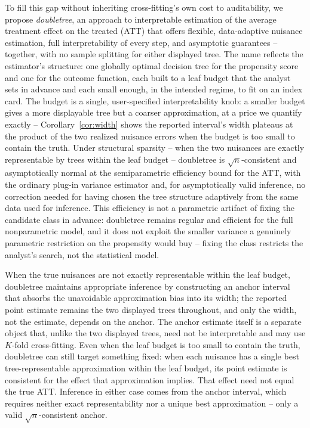\documentclass[12pt]{article}
\begin{document}
To fill this gap without inheriting cross-fitting's own cost to auditability, we propose \emph{doubletree}, an approach to interpretable estimation of the average treatment effect on the treated (ATT) that offers flexible, data-adaptive nuisance estimation, full interpretability of every step, and asymptotic guarantees -- together, with no sample splitting for either displayed tree. The name reflects the estimator's structure: one globally optimal decision tree \citep{xuStatisticalOptimalityOptimal2026,mctavishFastSparseDecision2022} for the propensity score and one for the outcome function, each built to a leaf budget that the analyst sets in advance and each small enough, in the intended regime, to fit on an index card. The budget is a single, user-specified interpretability knob: a smaller budget gives a more displayable tree but a coarser approximation, at a price we quantify exactly -- Corollary~\ref{cor:width} shows the reported interval's width plateaus at the product of the two realized nuisance errors when the budget is too small to contain the truth. Under structural sparsity -- when the two nuisances are exactly representable by trees within the leaf budget -- doubletree is $\sqrt n$-consistent and asymptotically normal at the semiparametric efficiency bound for the ATT, with the ordinary plug-in variance estimator and, for asymptotically valid inference, no correction needed for having chosen the tree structure adaptively from the same data used for inference. This efficiency is not a parametric artifact of fixing the candidate class in advance: doubletree remains regular and efficient for the full nonparametric model, and it does not exploit the smaller variance a genuinely parametric restriction on the propensity would buy -- fixing the class restricts the analyst's search, not the statistical model. 

When the true nuisances are not exactly representable within the leaf budget, doubletree maintains appropriate inference by constructing an anchor interval that absorbs the unavoidable approximation bias into its width; the reported point estimate remains the two displayed trees throughout, and only the width, not the estimate, depends on the anchor. The anchor estimate itself is a separate object that, unlike the two displayed trees, need not be interpretable and may use $K$-fold cross-fitting. Even when the leaf budget is too small to contain the truth, doubletree can still target something fixed: when each nuisance has a single best tree-representable approximation within the leaf budget, its point estimate is consistent for the effect that approximation implies. That effect need not equal the true ATT. Inference in either case comes from the anchor interval, which requires neither exact representability nor a unique best approximation -- only a valid $\sqrt n$-consistent anchor.
\end{document}
